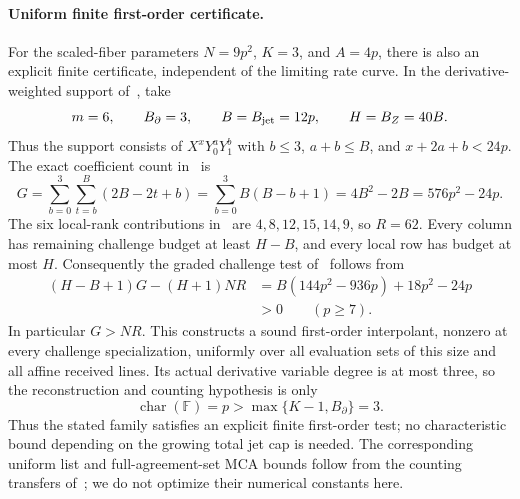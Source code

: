 \paragraph{Uniform finite first-order certificate.}
For the scaled-fiber parameters $N=9p^2$, $K=3$, and $A=4p$,
there is also an explicit finite certificate, independent of the limiting
rate curve. In the derivative-weighted support of~\cite[Eq.~(60)]{dkt2026}, take
\[
 m=6,\qquad B_\partial=3,\qquad
 B=B_{\rm jet}=12p,\qquad H=B_Z=40B.
\]
Thus the support consists of $X^xY_0^aY_1^b$ with
$b\le3$, $a+b\le B$, and $x+2a+b<24p$.
The exact coefficient count in~\cite[Eq.~(61)]{dkt2026} is
\[
 G=\sum_{b=0}^{3}\sum_{t=b}^{B}(2B-2t+b)
   =\sum_{b=0}^{3}B(B-b+1)
   =4B^2-2B=576p^2-24p.
\]
The six local-rank contributions in~\cite[Eq.~(62)]{dkt2026}
are $4,8,12,15,14,9$, so $R=62$.
Every column has remaining challenge budget at least $H-B$,
and every local row has budget at most $H$. Consequently the graded
challenge test of~\cite[Proposition~5.10]{dkt2026} follows from
\begin{align*}
 (H-B+1)G-(H+1)NR
 &=B(144p^2-936p)+18p^2-24p\\
 &>0 \qquad (p\ge7).
\end{align*}
In particular $G>NR$. This constructs a sound first-order interpolant,
nonzero at every challenge specialization, uniformly over all evaluation
sets of this size and all affine received lines. Its actual derivative
variable degree is at most three, so the reconstruction and counting
hypothesis is only
\[
 \operatorname{char}(\mathbb F)=p>\max\{K-1,B_\partial\}=3.
\]
Thus the stated family satisfies an explicit finite first-order test;
no characteristic bound depending on the growing total jet cap is needed.
The corresponding uniform list and full-agreement-set MCA bounds follow
from the counting transfers of~\cite[Lemma~5.6]{dkt2026}; we do not optimize
their numerical constants here.
